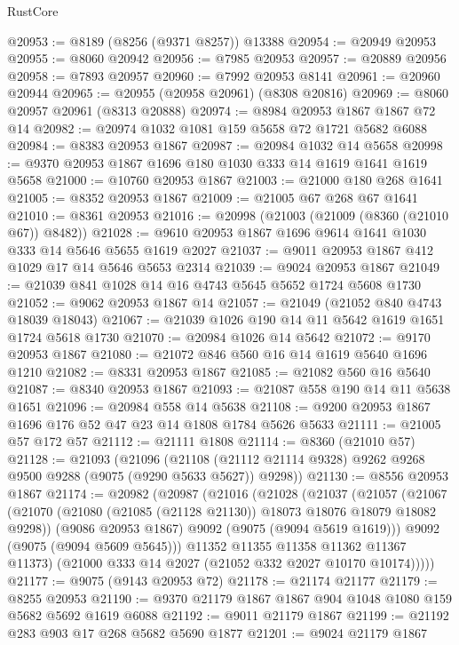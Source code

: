 \begin{lexlean}{RustCore}
\begin{coremodule}
@20953 := @8189 (@8256 (@9371 @8257)) @13388
@20954 := @20949 @20953
@20955 := @8060 @20942
@20956 := @7985 @20953
@20957 := @20889 @20956
@20958 := @7893 @20957
@20960 := @7992 @20953 @8141
@20961 := @20960 @20944
@20965 := @20955 (@20958 @20961) (@8308 @20816)
@20969 := @8060 @20957 @20961 (@8313 @20888)
@20974 := @8984 @20953 @1867 @1867 @72 @14
@20982 := @20974 @1032 @1081 @159 @5658 @72 @1721 @5682 @6088
@20984 := @8383 @20953 @1867
@20987 := @20984 @1032 @14 @5658
@20998 := @9370 @20953 @1867 @1696 @180 @1030 @333 @14 @1619 @1641 @1619 @5658
@21000 := @10760 @20953 @1867
@21003 := @21000 @180 @268 @1641
@21005 := @8352 @20953 @1867
@21009 := @21005 @67 @268 @67 @1641
@21010 := @8361 @20953
@21016 := @20998 (@21003 (@21009 (@8360 (@21010 @67)) @8482))
@21028 := @9610 @20953 @1867 @1696 @9614 @1641 @1030 @333 @14 @5646 @5655 @1619 @2027
@21037 := @9011 @20953 @1867 @412 @1029 @17 @14 @5646 @5653 @2314
@21039 := @9024 @20953 @1867
@21049 := @21039 @841 @1028 @14 @16 @4743 @5645 @5652 @1724 @5608 @1730
@21052 := @9062 @20953 @1867 @14
@21057 := @21049 (@21052 @840 @4743 @18039 @18043)
@21067 := @21039 @1026 @190 @14 @11 @5642 @1619 @1651 @1724 @5618 @1730
@21070 := @20984 @1026 @14 @5642
@21072 := @9170 @20953 @1867
@21080 := @21072 @846 @560 @16 @14 @1619 @5640 @1696 @1210
@21082 := @8331 @20953 @1867
@21085 := @21082 @560 @16 @5640
@21087 := @8340 @20953 @1867
@21093 := @21087 @558 @190 @14 @11 @5638 @1651
@21096 := @20984 @558 @14 @5638
@21108 := @9200 @20953 @1867 @1696 @176 @52 @47 @23 @14 @1808 @1784 @5626 @5633
@21111 := @21005 @57 @172 @57
@21112 := @21111 @1808
@21114 := @8360 (@21010 @57)
@21128 := @21093
    (@21096
      (@21108 (@21112 @21114 @9328) @9262 @9268 @9500 @9288 (@9075 (@9290 @5633 @5627)) @9298))
@21130 := @8556 @20953 @1867
@21174 := @20982
    (@20987
      (@21016
        (@21028
          (@21037
            (@21057
              (@21067
                (@21070 (@21080 (@21085 (@21128 @21130)) @18073 @18076 @18079 @18082 @9298))
                (@9086 @20953 @1867)
                @9092
                (@9075 (@9094 @5619 @1619)))
              @9092
              (@9075 (@9094 @5609 @5645)))
            @11352
            @11355
            @11358
            @11362
            @11367
            @11373)
          (@21000 @333 @14 @2027 (@21052 @332 @2027 @10170 @10174)))))
@21177 := @9075 (@9143 @20953 @72)
@21178 := @21174 @21177
@21179 := @8255 @20953
@21190 := @9370 @21179 @1867 @1867 @904 @1048 @1080 @159 @5682 @5692 @1619 @6088
@21192 := @9011 @21179 @1867
@21199 := @21192 @283 @903 @17 @268 @5682 @5690 @1877
@21201 := @9024 @21179 @1867

\end{coremodule}
\end{lexlean}
